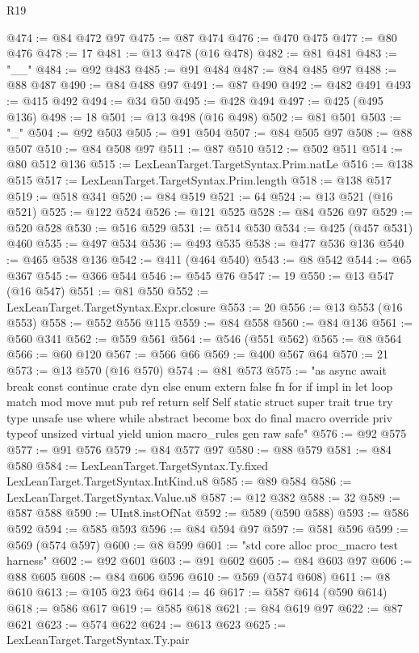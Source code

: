\begin{lexlean}{R19}
\begin{coremodule}
{{{{{{{{{{{{{{{{{{{{{{{{{{{{{{{{{{{{{{{{{{{{{{{{{{{{{{{{{{{{{{{{{{{{{{{{{{{{{{{{{{{{{{{@474 := @84 @472 @97
@475 := @87 @474
@476 := @470 @475
@477 := @80 @476
@478 := 17
@481 := @13 @478 (@16 @478)
@482 := @81 @481
@483 := "__"
@484 := @92 @483
@485 := @91 @484
@487 := @84 @485 @97
@488 := @88 @487
@490 := @84 @488 @97
@491 := @87 @490
@492 := @482 @491
@493 := @415 @492
@494 := @34 @50
@495 := @428 @494
@497 := @425 (@495 @136)
@498 := 18
@501 := @13 @498 (@16 @498)
@502 := @81 @501
@503 := "_"
@504 := @92 @503
@505 := @91 @504
@507 := @84 @505 @97
@508 := @88 @507
@510 := @84 @508 @97
@511 := @87 @510
@512 := @502 @511
@514 := @80 @512 @136
@515 := LexLeanTarget.TargetSyntax.Prim.natLe
@516 := @138 @515
@517 := LexLeanTarget.TargetSyntax.Prim.length
@518 := @138 @517
@519 := @518 @341
@520 := @84 @519
@521 := 64
@524 := @13 @521 (@16 @521)
@525 := @122 @524
@526 := @121 @525
@528 := @84 @526 @97
@529 := @520 @528
@530 := @516 @529
@531 := @514 @530
@534 := @425 (@457 @531) @460
@535 := @497 @534
@536 := @493 @535
@538 := @477 @536 @136
@540 := @465 @538 @136
@542 := @411 (@464 @540)
@543 := @8 @542
@544 := @65 @367
@545 := @366 @544
@546 := @545 @76
@547 := 19
@550 := @13 @547 (@16 @547)
@551 := @81 @550
@552 := LexLeanTarget.TargetSyntax.Expr.closure
@553 := 20
@556 := @13 @553 (@16 @553)
@558 := @552 @556 @115
@559 := @84 @558
@560 := @84 @136
@561 := @560 @341
@562 := @559 @561
@564 := @546 (@551 @562)
@565 := @8 @564
@566 := @60 @120
@567 := @566 @66
@569 := @400 @567 @64
@570 := 21
@573 := @13 @570 (@16 @570)
@574 := @81 @573
@575 := "as async await break const continue crate dyn else enum extern false fn for if impl in let loop match mod move mut pub ref return self Self static struct super trait true try type unsafe use where while abstract become box do final macro override priv typeof unsized virtual yield union macro_rules gen raw safe"
@576 := @92 @575
@577 := @91 @576
@579 := @84 @577 @97
@580 := @88 @579
@581 := @84 @580
@584 := LexLeanTarget.TargetSyntax.Ty.fixed LexLeanTarget.TargetSyntax.IntKind.u8
@585 := @89 @584
@586 := LexLeanTarget.TargetSyntax.Value.u8
@587 := @12 @382
@588 := 32
@589 := @587 @588
@590 := UInt8.instOfNat
@592 := @589 (@590 @588)
@593 := @586 @592
@594 := @585 @593
@596 := @84 @594 @97
@597 := @581 @596
@599 := @569 (@574 @597)
@600 := @8 @599
@601 := "std core alloc proc_macro test harness"
@602 := @92 @601
@603 := @91 @602
@605 := @84 @603 @97
@606 := @88 @605
@608 := @84 @606 @596
@610 := @569 (@574 @608)
@611 := @8 @610
@613 := @105 @23 @64
@614 := 46
@617 := @587 @614 (@590 @614)
@618 := @586 @617
@619 := @585 @618
@621 := @84 @619 @97
@622 := @87 @621
@623 := @574 @622
@624 := @613 @623
@625 := LexLeanTarget.TargetSyntax.Ty.pair
}}}}}}}}}}}}}}}}}}}}}}}}}}}}}}}}}}}}}}}}}}}}}}}}}}}}}}}}}}}}}}}}}}}}}}}}}}}}}}}}}}}}}}}
\end{coremodule}
\end{lexlean}
